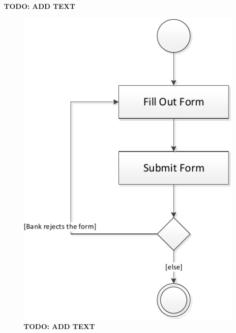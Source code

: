 \textbf{TODO: ADD TEXT}

\begin{figure}
\centerline{\includegraphics[width=\textwidth]{img/activity_diagrams/Buy_toll_tag}}
\caption{\textbf{TODO: ADD TEXT}}
\label{fig:activity_btt}
\end{figure}

